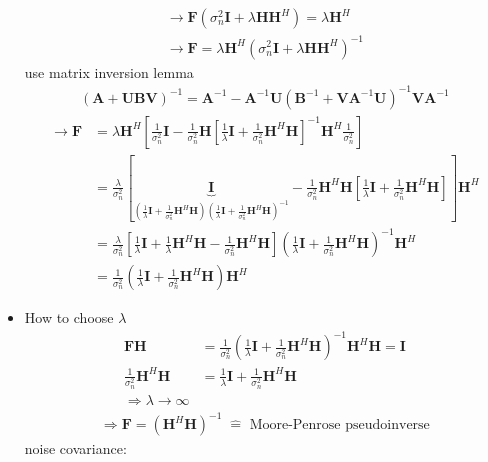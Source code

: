 \documentclass[a4paper, 10pt]{article}
\begin{document}
\begin{itemize}
\begin{align*}
		\rightarrow \mathbf{F}(\sigma_n^2\mathbf{I}+\lambda\mathbf{HH}^H)=\lambda\mathbf{H}^H\\
		\rightarrow \mathbf{F}=\lambda\mathbf{H}^H(\sigma_n^2\mathbf{I}+\lambda\mathbf{HH}^H)^{-1}
	\end{align*}
	use matrix inversion lemma
	\begin{align*}
	(\mathbf{A}+\mathbf{UBV})^{-1}=\mathbf{A}^{-1}-\mathbf{A}^{-1}\mathbf{U}(\mathbf{B}^{-1}+\mathbf{VA}^{-1}\mathbf{U})^{-1}\mathbf{VA}^{-1}
	\end{align*}
	\begin{align*}
	\rightarrow\mathbf{F}&=\lambda\mathbf{H}^H\left[\frac{1}{\sigma_n^2}\mathbf{I}-\frac{1}{\sigma_n^2}\mathbf{H}
	\left[\frac{1}{\lambda}\mathbf{I}+\frac{1}{\sigma_n^2}\mathbf{H}^H\mathbf{H}\right]^{-1}\mathbf{H}^H\frac{1}{\sigma_n^2}\right]\\
	&=\frac{\lambda}{\sigma_n^2}\left[\underbrace{\mathbf{I}}_{\left(\frac{1}{\lambda}\mathbf{I}+\frac{1}{\sigma_n^2}\mathbf{H}^H\mathbf{H}\right)
	\left(\frac{1}{\lambda}\mathbf{I}+\frac{1}{\sigma_n^2}\mathbf{H}^H\mathbf{H}\right)^{-1}}-\frac{1}{\sigma_n^2}\mathbf{H}^H\mathbf{H}
	\left[\frac{1}{\lambda}\mathbf{I}+\frac{1}{\sigma_n^2}\mathbf{H}^H\mathbf{H}\right]\right]\mathbf{H}^H\\
	&=\frac{\lambda}{\sigma_n^2}\left[\frac{1}{\lambda}\mathbf{I}+\frac{1}{\lambda}\mathbf{H}^H\mathbf{H}-\frac{1}{\sigma_n^2}\mathbf{H}^H\mathbf{H}\right]
	\left(\frac{1}{\lambda}\mathbf{I}+\frac{1}{\sigma_n^2}\mathbf{H}^H\mathbf{H}\right)^{-1}\mathbf{H}^H\\
	&=\frac{1}{\sigma_n^2}\left(\frac{1}{\lambda}\mathbf{I}+\frac{1}{\sigma_n^2}\mathbf{H}^H\mathbf{H}\right)\mathbf{H}^H
	\end{align*}
	\item How to choose $\lambda$
	\begin{align*}
	\mathbf{FH}&=\frac{1}{\sigma_n^2}\left(\frac{1}{\lambda}\mathbf{I}+\frac{1}{\sigma_n^2}\mathbf{H}^H\mathbf{H}\right)^{-1}\mathbf{H}^H\mathbf{H}=\mathbf{I}\\
	\frac{1}{\sigma_n^2}\mathbf{H}^H\mathbf{H}&=\frac{1}{\lambda}\mathbf{I}+\frac{1}{\sigma_n^2}\mathbf{H}^H\mathbf{H}\\
	\Rightarrow \lambda \rightarrow \infty
	\end{align*}
	\begin{align*}
	\Rightarrow \boxed{\mathbf{F}=(\mathbf{H}^H\mathbf{H})^{-1}}\;\widehat{=}\text{ Moore-Penrose pseudoinverse}	
	\end{align*}
noise covariance:

\end{itemize}
\end{document}
